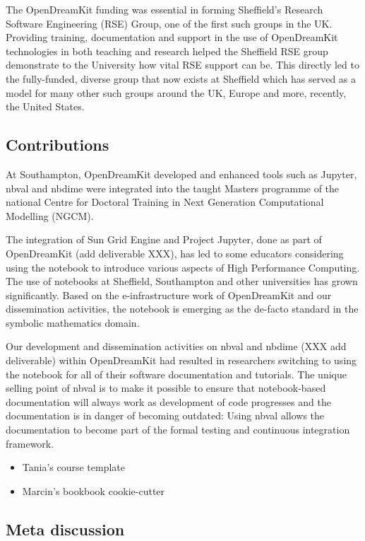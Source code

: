 \documentclass{deliverablereport}
\begin{document}
The OpenDreamKit funding was essential in forming Sheffield's Research
Software Engineering (RSE) Group, one of the first such groups in the
UK. Providing training, documentation and support in the use of
OpenDreamKit technologies in both teaching and research helped the
Sheffield RSE group demonstrate to the University how vital RSE support
can be. This directly led to the fully-funded, diverse group that now
exists at Sheffield which has served as a model for many other such
groups around the UK, Europe and more, recently, the United States.

\hypertarget{contributions}{%
\subsection{Contributions}\label{contributions}}

At Southampton, OpenDreamKit developed and enhanced tools such as
Jupyter, nbval and nbdime were integrated into the taught Masters
programme of the national Centre for Doctoral Training in Next
Generation Computational Modelling (NGCM).

The integration of Sun Grid Engine and Project Jupyter, done as part of
OpenDreamKit (add deliverable XXX), has led to some educators
considering using the notebook to introduce various aspects of High
Performance Computing. The use of notebooks at Sheffield, Southampton
and other universities has grown significantly. Based on the
e-infrastructure work of OpenDreamKit and our dissemination activities,
the notebook is emerging as the de-facto standard in the symbolic
mathematics domain.

Our development and dissemination activities on nbval and nbdime (XXX
add deliverable) within OpenDreamKit had resulted in researchers
switching to using the notebook for all of their software documentation
and tutorials. The unique selling point of nbval is to make it possible
to ensure that notebook-based documentation will always work as
development of code progresses and the documentation is in danger of
becoming outdated: Using nbval allows the documentation to become part
of the formal testing and continuous integration framework.

\begin{itemize}
\tightlist
\item
  Tania's course template
\item
  Marcin's bookbook cookie-cutter
\end{itemize}

\hypertarget{meta-discussion}{%
\subsection{Meta discussion}\label{meta-discussion}}
\end{document}
